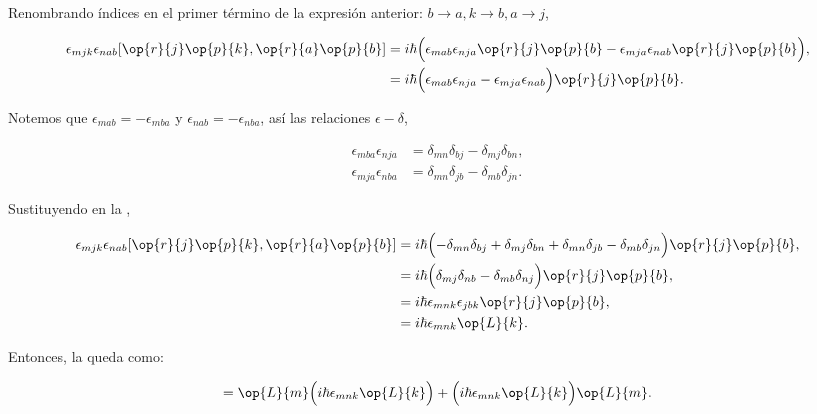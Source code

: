 \documentclass[../main.tex]{subfiles}
\begin{document}
\begin{problema}
	Renombrando índices en el primer término de la expresión anterior:
	\(b \to a, k \to b, a \to j\),

	\begin{align}
		\epsilon_{mjk}\epsilon_{nab}[\op{r}{j}\op{p}{k}, \op{r}{a}\op{p}{b}] & =
		i\hbar \Bigl(\epsilon_{mab}\epsilon_{nja}\op{r}{j}\op{p}{b}
		- \epsilon_{mja}\epsilon_{nab}\op{r}{j}\op{p}{b}\Bigr),\nonumber                                                   \\
		                                                                     & = i\hbar \Bigl(\epsilon_{mab}\epsilon_{nja}
		- \epsilon_{mja}\epsilon_{nab}\Bigr)\op{r}{j}\op{p}{b}.
		\label{eq:commutator-rjpk-rapb}
	\end{align}

	\pagebreak
	Notemos que \(\epsilon_{mab} = - \epsilon_{mba}\) y \(\epsilon_{nab} = -\epsilon_{nba}\),
	así las relaciones \(\epsilon-\delta\),

	\begin{align*}
		\epsilon_{mba}\epsilon_{nja} & = \delta_{mn}\delta_{bj} - \delta_{mj}\delta_{bn}, \\
		\epsilon_{mja}\epsilon_{nba} & = \delta_{mn}\delta_{jb} - \delta_{mb}\delta_{jn}.
	\end{align*}

	Sustituyendo en la ,

	\begin{align*}
		\epsilon_{mjk}\epsilon_{nab}[\op{r}{j}\op{p}{k}, \op{r}{a}\op{p}{b}] & =
		i\hbar \Bigl(-\delta_{mn}\delta_{bj} + \delta_{mj}\delta_{bn} + \delta_{mn}\delta_{jb} - \delta_{mb}\delta_{jn}\Bigr)\op{r}{j}\op{p}{b},                       \\
		                                                                     & = i\hbar \Bigl(\delta_{mj}\delta_{nb} - \delta_{mb}\delta_{nj}\Bigr)\op{r}{j}\op{p}{b}, \\
		                                                                     & = i\hbar\epsilon_{mnk}\epsilon_{jbk}\op{r}{j}\op{p}{b},                                 \\
		                                                                     & = i\hbar\epsilon_{mnk}\op{L}{k}.
	\end{align*}

	Entonces, la  queda como:

	\begin{equation*}
		[\op{L}{}{2}, \op{L}{n}] = \op{L}{m}\Bigl(i\hbar\epsilon_{mnk}\op{L}{k}\Bigr) +
		\Bigl(i\hbar\epsilon_{mnk}\op{L}{k}\Bigr)\op{L}{m}.
	\end{equation*}


\end{problema}
\end{document}

